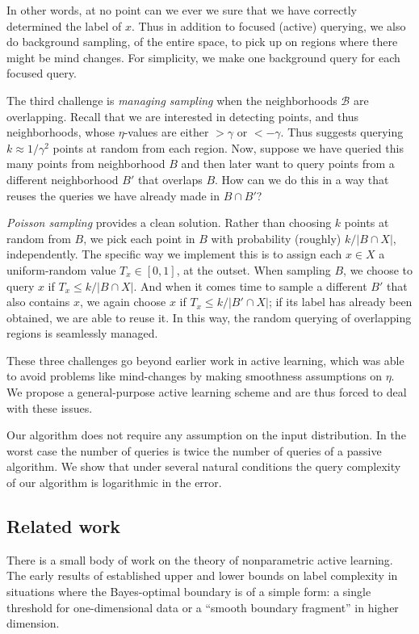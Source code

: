 \documentclass{article}
\def\B{{\mathcal B}}
\begin{document}
In other words, at no point can we ever we sure that we have
correctly determined the label of $x$. Thus in addition to focused
(active) querying, we also do background sampling, of the entire
space, to pick up on regions where there might be mind changes. For
simplicity, we make one background query for each focused query.

The third challenge is \emph{managing sampling} when the neighborhoods
$\B$ are overlapping. Recall that we are interested in detecting
points, and thus neighborhoods, whose $\eta$-values are either
$> \gamma$ or $<-\gamma$. Thus suggests querying
$k \approx 1/\gamma^2$ points at random from each region. Now, suppose
we have queried this many points from neighborhood $B$ and then later
want to query points from a different neighborhood $B'$ that overlaps
$B$. How can we do this in a way that reuses the queries we have
already made in $B \cap B'$?

\emph{Poisson sampling} provides a clean solution. Rather than
choosing $k$ points at random from $B$, we pick each point in $B$ with
probability (roughly) $k/|B \cap X|$, independently. The specific way
we implement this is to assign each $x \in X$ a uniform-random value
$T_x \in [0,1]$, at the outset. When sampling $B$, we choose to query
$x$ if $T_x \leq k/|B \cap X|$. And when it comes time to sample a
different $B'$ that also contains $x$, we again choose $x$ if
$T_x \leq k/|B' \cap X|$; if its label has already been obtained, we
are able to reuse it. In this way, the random querying of overlapping
regions is seamlessly managed.

These three challenges go beyond earlier work in active learning,
which was able to avoid problems like mind-changes by making
smoothness assumptions on $\eta$. We propose a general-purpose active
learning scheme and are thus forced to deal with these issues.

Our algorithm does not require any assumption on the input
distribution. In the worst case the number of queries is twice the
number of queries of a passive algorithm. We show that under several
natural conditions the query complexity of our algorithm is
logarithmic in the error.

\subsection{Related work}

There is a small body of work on the theory of nonparametric active learning. The early results of \cite{CN08} established upper and lower bounds on label complexity in situations where the Bayes-optimal boundary is of a simple form: a single threshold for one-dimensional data or a ``smooth boundary fragment'' in higher dimension.
\end{document}
